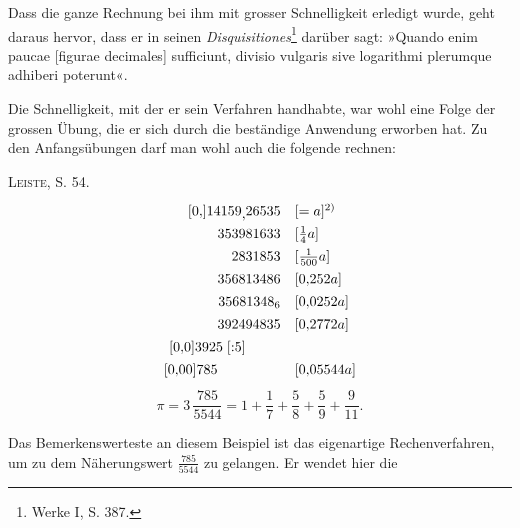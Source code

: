 Dass die ganze Rechnung bei ihm mit grosser Schnelligkeit erledigt wurde,
geht daraus hervor, dass er in seinen \textit{Disquisitiones}\footnote{Werke I, S. 387.} darüber sagt: »Quando
enim paucae [figurae decimales] sufficiunt, divisio vulgaris sive logarithmi
 plerumque adhiberi poterunt«.

Die Schnelligkeit, mit der er sein Verfahren handhabte, war wohl eine
Folge der grossen Übung, die er sich durch die beständige Anwendung erworben hat. Zu den Anfangsübungen darf man wohl auch die folgende
rechnen:
\par\smallskip\noindent\hspace*{3em}\textsc{Leiste}, S. 54.
\[
\renewcommand{\arraystretch}{1.35}
\begin{array}{r@{\quad}l}
[0{,}]14159\MLowComma26535&[=a]\text{\textsuperscript{2)}}\\
353981633&[\frac{1}{4}a]\\
2831853&[\frac{1}{500}a]\\
356813486&[0{,}252a]\\
35681348_{6}&[0{,}0252a]\\
392494835&[0{,}2772a]\\
{}[0{,}0]3925\;[\mathbin{:}5]\phantom{00000}&\\
{}[0{,}00]785\phantom{000000000}&[0{,}05544a]
\end{array}
\]
\setcounter{footnote}{2}
\[
\pi=3\,\frac{785}{5544}=1+\frac{1}{7}+\frac{5}{8}+\frac{5}{9}+\frac{9}{11}.
\]
\par\noindent\hspace*{\parindent}Das Bemerkenswerteste an diesem Beispiel ist das eigenartige Rechenverfahren, um zu dem Näherungswert $\frac{785}{5544}$ zu gelangen. Er wendet hier die
